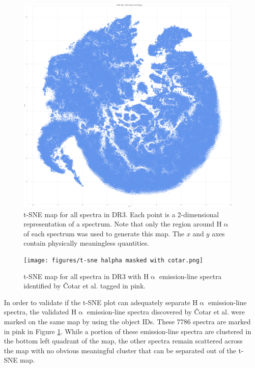 \begin{figure}[!htb]
\centering
\includegraphics[scale=0.12]{figures/t-sne halpha masked.png}
\caption{t-SNE map for all spectra in DR3. Each point is a 2-dimensional representation of a spectrum. Note that only the region around H$\upalpha$ of each spectrum was used to generate this map. The $x$ and $y$ axes contain physically meaningless quantities.}
\end{figure}

\begin{figure}[!htb]
\centering
\texttt{[image: figures/t-sne halpha masked with cotar.png]}
\caption{t-SNE map for all spectra in DR3 with H$\upalpha$ emission-line spectra identified by Čotar et al. tagged in pink.}
\label{fig5.3}
\end{figure}

In order to validate if the t-SNE plot can adequately separate H$\upalpha$ emission-line spectra, the validated H$\upalpha$ emission-line spectra discovered by Čotar et al. \citep{vcotar2021galah} were marked on the same map by using the object IDs. These 7786 spectra are marked in pink in Figure \ref{fig5.3}. While a portion of these emission-line spectra are clustered in the bottom left quadrant of the map, the other spectra remain scattered across the map with no obvious meaningful cluster that can be separated out of the t-SNE map. 

